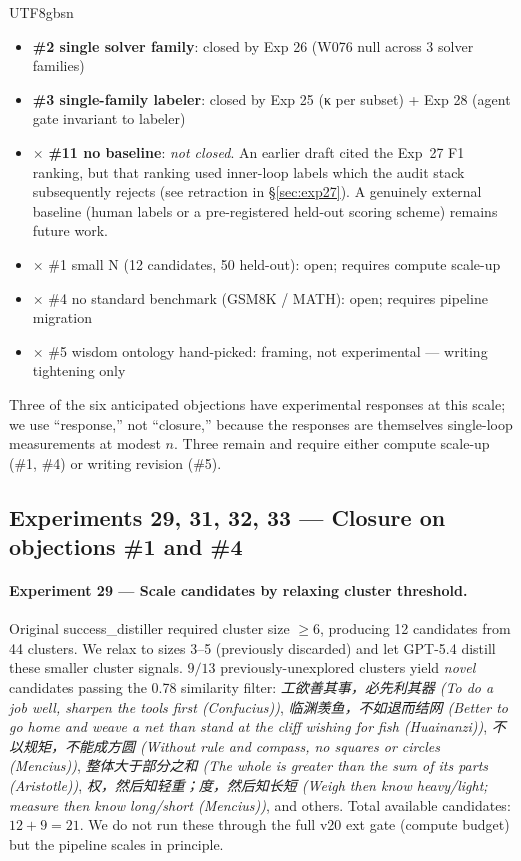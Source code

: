 \documentclass{article}
\begin{document}
\begin{CJK*}{UTF8}{gbsn}
\begin{itemize}[leftmargin=*, topsep=2pt, itemsep=1pt]
  \item \checkmark \textbf{\#2 single solver family}:
    closed by Exp 26 (W076 null across 3 solver families)
  \item \checkmark \textbf{\#3 single-family labeler}:
    closed by Exp 25 (κ per subset) + Exp 28 (agent gate
    invariant to labeler)
  \item $\times$ \textbf{\#11 no baseline}:
    \emph{not closed}. An earlier draft cited the Exp~27 F1
    ranking, but that ranking used inner-loop labels which the
    audit stack subsequently rejects (see retraction in
    \S\ref{sec:exp27}). A genuinely external baseline (human
    labels or a pre-registered held-out scoring scheme) remains
    future work.
  \item $\times$ \#1 small N (12 candidates, 50 held-out):
    open; requires compute scale-up
  \item $\times$ \#4 no standard benchmark (GSM8K / MATH):
    open; requires pipeline migration
  \item $\times$ \#5 wisdom ontology hand-picked:
    framing, not experimental — writing tightening only
\end{itemize}

Three of the six anticipated objections have experimental
responses at this scale; we use ``response,'' not ``closure,''
because the responses are themselves single-loop measurements at
modest \(n\). Three remain and require either compute scale-up
(\#1, \#4) or writing revision (\#5).

\subsection{Experiments 29, 31, 32, 33 — Closure on objections \#1 and \#4}
\label{sec:rebuttal2}

\paragraph{Experiment 29 — Scale candidates by relaxing cluster
threshold.} Original success\_distiller required cluster size \(\geq 6\),
producing 12 candidates from 44 clusters. We relax to sizes 3--5
(previously discarded) and let GPT-5.4 distill these smaller cluster
signals. \(9/13\) previously-unexplored clusters yield \emph{novel}
candidates passing the 0.78 similarity filter:
\emph{工欲善其事，必先利其器 (\emph{To do a job well, sharpen the tools first (Confucius)})}, \emph{临渊羡鱼，不如退而结网 (\emph{Better to go home and weave a net than stand at the cliff wishing for fish (Huainanzi)})},
\emph{不以规矩，不能成方圆 (\emph{Without rule and compass, no squares or circles (Mencius)})}, \emph{整体大于部分之和 (\emph{The whole is greater than the sum of its parts (Aristotle)})},
\emph{权，然后知轻重；度，然后知长短 (\emph{Weigh then know heavy/light; measure then know long/short (Mencius)})}, and others. Total available
candidates: \(12 + 9 = 21\). We do not run these through the full
v20 ext gate (compute budget) but the pipeline scales in principle.


\end{CJK*}
\end{document}
